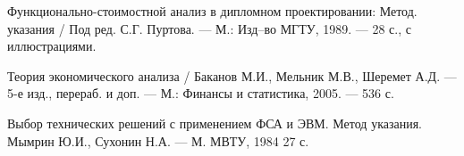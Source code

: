 
 Функционально-стоимостной анализ в дипломном проектировании:
                    Метод. указания / Под ред. С.Г. Пуртова. ---
                    М.: Изд--во МГТУ, 1989. --- 28 с., с иллюстрациями.

 Теория экономического анализа / Баканов М.И., Мельник М.В.,
                    Шеремет А.Д. --- 5-е изд., перераб. и доп. --- М.:
                    Финансы и статистика, 2005. --- 536 с.

 Выбор технических решений с применением ФСА и ЭВМ.
                      Метод указания. Мымрин Ю.И., Сухонин Н.А. ---
                      М. МВТУ, 1984 27 с.

\endinput
